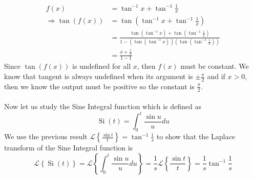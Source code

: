 \documentclass{report}
\theoremstyle{definition}
\theoremstyle{remark}
\newcommand{\lapt}[1]{\mathscr{L}\left\{ #1\right\}}
\begin{document}
\begin{equation*}
    \begin{split}
        f(x) & =\tan^{-1}x + \tan^{-1}\frac{1}{x}\\
        \Rightarrow \tan (f(x)) &= \tan \left( \tan^{-1}x + \tan^{-1}\frac{1}{x} \right)\\
        &= \frac{\tan (\tan^{-1}x) + \tan(\tan^{-1} \frac{1}{x})}{1-(\tan(\tan^{-1}x))(\tan(\tan^{-1} \frac{1}{x}))} \\
        &= \frac{x + \frac{1}{x}}{1-1}
    \end{split}
\end{equation*}
Since $\tan (f(x))$ is undefined for all $x$, then $f(x)$ must be constant. We know that tangent is always undefined when its argument is $\pm \frac{\pi}{2}$ and if $x>0$, then we know the output must be positive so the constant is $\frac{\pi}{2}$. \\\\ 
Now let us study the Sine Integral function which is defined as
\begin{equation*}
    \operatorname{Si}(t) = \int^t_0 \frac{\sin u}{u}du
\end{equation*}
We use the previous result $\lapt{\frac{\sin t}{t}} = \tan^{-1}\frac{1}{s}$ to show that the Laplace transform of the Sine Integral function is 
\begin{equation*}
    \lapt{\operatorname{Si}(t)} = \lapt{\int^t_0 \frac{\sin u}{u}du} = \frac{1}{s} \lapt{\frac{\sin t}{t}} = \frac{1}{s}\tan^{-1}\frac{1}{s}
\end{equation*}
\end{document}

